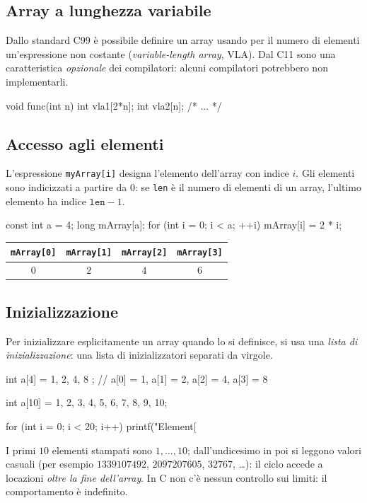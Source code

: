 \documentclass[11pt,a4paper]{article}
\begin{document}
\subsection{Array a lunghezza variabile}

Dallo standard C99 è possibile definire un array usando per il numero di elementi un'espressione non costante (\emph{variable-length array}, VLA). Dal C11 sono una caratteristica \emph{opzionale} dei compilatori: alcuni compilatori potrebbero non implementarli.
\begin{codice}
void func(int n)
{
    int vla1[2*n];
    int vla2[n];
    /* ... */
}
\end{codice}

\subsection{Accesso agli elementi}

L'espressione \lstinline|myArray[i]| designa l'elemento dell'array con indice $i$. Gli elementi sono indicizzati a partire da $0$: se \lstinline|len| è il numero di elementi di un array, l'ultimo elemento ha indice $\texttt{len}-1$.
\begin{codice}
const int a = 4;
long mArray[a];
for (int i = 0; i < a; ++i)
    mArray[i] = 2 * i;
\end{codice}
\begin{center}
\begin{tabular}{|c|c|c|c|}
\hline
\lstinline|mArray[0]| & \lstinline|mArray[1]| & \lstinline|mArray[2]| & \lstinline|mArray[3]|\\
\hline
$0$ & $2$ & $4$ & $6$\\
\hline
\end{tabular}
\end{center}

\subsection{Inizializzazione}

Per inizializzare esplicitamente un array quando lo si definisce, si usa una \emph{lista di inizializzazione}: una lista di inizializzatori separati da virgole.
\begin{codice}
int a[4] = { 1, 2, 4, 8 };   // a[0] = 1, a[1] = 2, a[2] = 4, a[3] = 8
\end{codice}

\begin{esempio}
\begin{codice}
int a[10] = {1, 2, 3, 4, 5, 6, 7, 8, 9, 10};

for (int i = 0; i < 20; i++) {
    printf("Element[%
}
\end{codice}
I primi $10$ elementi stampati sono $1,\dots,10$; dall'undicesimo in poi si leggono valori casuali (per esempio $1339107492$, $2097207605$, $32767$, \dots): il ciclo accede a locazioni \emph{oltre la fine dell'array}. In C non c'è nessun controllo sui limiti: il comportamento è indefinito.
\end{esempio}
\end{document}
